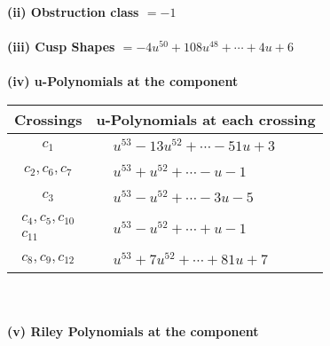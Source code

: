 \documentclass[1p]{elsarticle_modified}
\theoremstyle{definition}
\begin{document}
\flushleft \textbf{(ii) Obstruction class $= -1$}\\~\\
\flushleft \textbf{(iii) Cusp Shapes $= -4 u^{50}+108 u^{48}+\cdots+4 u+6$}\\~\\
\newpage\renewcommand{\arraystretch}{1}
\flushleft \textbf{(iv) u-Polynomials at the component}\newline \\
\begin{tabular}{m{50pt}|m{274pt}}
Crossings & \hspace{64pt}u-Polynomials at each crossing \\
\hline $$\begin{aligned}c_{1}\end{aligned}$$&$\begin{aligned}
&u^{53}-13 u^{52}+\cdots-51 u+3
\end{aligned}$\\
\hline $$\begin{aligned}c_{2},c_{6},c_{7}\end{aligned}$$&$\begin{aligned}
&u^{53}+u^{52}+\cdots- u-1
\end{aligned}$\\
\hline $$\begin{aligned}c_{3}\end{aligned}$$&$\begin{aligned}
&u^{53}- u^{52}+\cdots-3 u-5
\end{aligned}$\\
\hline $$\begin{aligned}c_{4},c_{5},c_{10}\\c_{11}\end{aligned}$$&$\begin{aligned}
&u^{53}- u^{52}+\cdots+u-1
\end{aligned}$\\
\hline $$\begin{aligned}c_{8},c_{9},c_{12}\end{aligned}$$&$\begin{aligned}
&u^{53}+7 u^{52}+\cdots+81 u+7
\end{aligned}$\\
\hline
\end{tabular}\\~\\
\newpage\renewcommand{\arraystretch}{1}
\flushleft \textbf{(v) Riley Polynomials at the component}\newline \\
\end{document}
